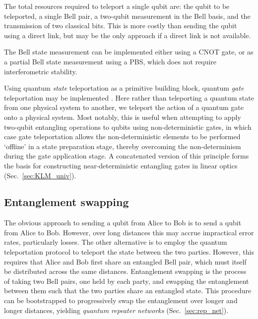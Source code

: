 \documentclass[aps,rmp,twocolumn,amsmath,amssymb,nofootinbib,superscriptaddress,longbibliography,floatfix]{revtex4-1}
\begin{document}
The total resources required to teleport a single qubit are: the qubit to be teleported, a single Bell pair, a two-qubit measurement in the Bell basis, and the transmission of two classical bits. This is more costly than sending the qubit using a direct link, but may be the only approach if a direct link is not available.

The Bell state measurement can be implemented either using a CNOT gate, or as a partial Bell state measurement using a PBS, which does not require interferometric stability.

Using quantum \emph{state} teleportation as a primitive building block, quantum \emph{gate} teleportation may be implemented \cite{bib:GottesmanChuang99}. Here rather than teleporting a quantum state from one physical system to another, we teleport the action of a quantum gate onto a physical system. Most notably, this is useful when attempting to apply two-qubit entangling operations to qubits using non-deterministic gates, in which case gate teleportation allows the non-deterministic elements to be performed `offline' in a state preparation stage, thereby overcoming the non-determinism during the gate application stage. A concatenated version of this principle forms the basis for constructing near-deterministic entangling gates in linear optics (Sec.~\ref{sec:KLM_univ}).

%
%

\subsection{Entanglement swapping} \label{sec:swapping}

The obvious approach to sending a qubit from Alice to Bob is to send a qubit from Alice to Bob. However, over long distances this may accrue impractical error rates, particularly losses. The other alternative is to employ the quantum teleportation protocol to teleport the state between the two parties. However, this requires that Alice and Bob first share an entangled Bell pair, which must itself be distributed across the same distances. Entanglement swapping is the process of taking two Bell pairs, one held by each party, and swapping the entanglement between them such that the two parties share an entangled state. This procedure can be bootstrapped to progressively swap the entanglement over longer and longer distances, yielding \emph{quantum repeater networks} (Sec.~\ref{sec:rep_net}).
\end{document}
